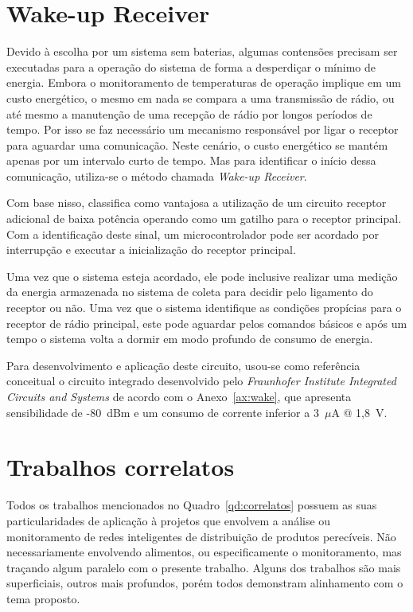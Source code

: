 \section{Wake-up Receiver}
Devido à escolha por um sistema sem baterias, algumas contensões precisam ser executadas para a operação do sistema de forma a desperdiçar o mínimo de energia. Embora o monitoramento de temperaturas de operação implique em um custo energético, o mesmo em nada se compara a uma transmissão de rádio, ou até mesmo a manutenção de uma recepção de rádio por longos períodos de tempo. Por isso se faz necessário um mecanismo responsável por ligar o receptor para aguardar uma comunicação. Neste cenário, o custo energético se mantém apenas por um intervalo curto de tempo. Mas para identificar o início dessa comunicação, utiliza-se o método chamada \textit{Wake-up Receiver}. 

Com base nisso,  classifica como vantajosa a utilização de um circuito receptor adicional de baixa potência operando como um gatilho para o receptor principal. Com a identificação deste sinal, um microcontrolador pode ser acordado por interrupção e executar a inicialização do receptor principal.

Uma vez que o sistema esteja acordado, ele pode inclusive realizar uma medição da energia armazenada no sistema de coleta para decidir pelo ligamento do receptor ou não. Uma vez que o sistema identifique as condições propícias para o receptor de rádio principal, este pode aguardar pelos comandos básicos e após um tempo o sistema volta a dormir em modo profundo de consumo de energia.

Para desenvolvimento e aplicação deste circuito, usou-se como referência conceitual o circuito integrado desenvolvido pelo \textit{Fraunhofer Institute Integrated Circuits and Systems} de acordo com o Anexo~\ref{ax:wake}, que apresenta sensibilidade de -80~dBm e um consumo de corrente inferior a 3~$\mu$A @ 1,8~V.

\section{Trabalhos correlatos}

Todos os trabalhos mencionados no Quadro~\ref{qd:correlatos} possuem as suas particularidades de aplicação à projetos que envolvem a análise ou monitoramento de redes inteligentes de distribuição de produtos perecíveis. Não necessariamente envolvendo alimentos, ou especificamente o monitoramento, mas traçando algum paralelo com o presente trabalho.
Alguns dos trabalhos são mais superficiais, outros mais profundos, porém todos demonstram alinhamento com o tema proposto.


